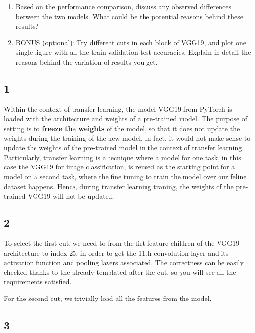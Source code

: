 \documentclass[11pt]{scrartcl}
\begin{document}
\begin{enumerate}
	\item Based on the performance comparison, 
	discuss any observed differences between the two models. 
	What could be the potential reasons behind these results?

	\item BONUS (optional): Try different cuts in each block of VGG19, 
	and plot one single figure with all the train-validation-test accuracies. 
	Explain in detail the reasons behind the variation of results you get.
\end{enumerate}


\subsection*{1}

Within the context of transfer learning, the model VGG19 from PyTorch 
is loaded with the architecture and weights of a pre-trained model.
The purpose of setting  
is to \textbf{freeze the weights} of the model,
so that it does not update the weights during the training of the new model.
In fact, it would not make sense to update the weights of the pre-trained model
in the context of transfer learning.
Particularly, transfer learning is a tecnique where a model for one task,
in this case the VGG19 for image classification, 
is reused as the starting point for a model on a second task,
where the fine tuning to train the model over our feline dataset happens.
Hence, during transfer learning traning, 
the weights of the pre-trained VGG19 will not be updated.


\subsection*{2}

To select the first cut, we need to from the firt feature children of the 
VGG19 architecture to index 25, in order to get the 11th convolution layer 
and its activation function and pooling layers associated.
The correctness can be easily checked thanks to the already templated 
after the cut, so you will see all the requirements satisfied.

For the second cut, we trivially load all the features from the model.


\subsection*{3}
\end{document}
